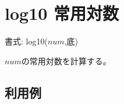 
%

\section{log10 常用対数\label{sect:log10}}

書式: log10($num$,底)

$num$の常用対数を計算する。

\subsection*{利用例}


%

